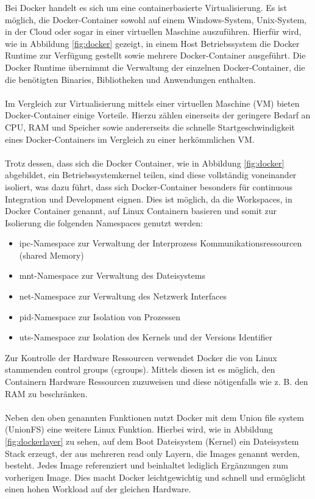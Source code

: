 Bei Docker handelt es sich um eine containerbasierte Virtualisierung. Es ist möglich, die Docker-Container sowohl auf einem Windows-System, Unix-System, in der Cloud oder sogar in einer virtuellen Maschine auszuführen. Hierfür wird, wie in Abbildung \ref{fig:docker} gezeigt, in einem Host Betriebssystem die Docker Runtime zur Verfügung gestellt sowie mehrere Docker-Container ausgeführt. Die Docker Runtime übernimmt die Verwaltung der einzelnen Docker-Container, die die benötigten Binaries, Bibliotheken und Anwendungen enthalten. 
\\\\
Im Vergleich zur Virtualisierung mittels einer virtuellen Maschine (VM) bieten Docker-Container einige Vorteile. Hierzu zählen einerseits der geringere Bedarf an CPU, RAM und Speicher sowie andererseits die schnelle Startgeschwindigkeit eines Docker-Containers im Vergleich zu einer herkömmlichen VM.
\\\\
Trotz dessen, dass sich die Docker Container, wie in Abbildung \ref{fig:docker} abgebildet, ein Betriebssystemkernel teilen, sind diese vollständig voneinander isoliert, was dazu führt, dass sich Docker-Container besonders für continuous Integration und Development eignen. Dies ist möglich, da die Workspaces, in Docker Container genannt, auf Linux Containern basieren und somit zur Isolierung die folgenden Namespaces genutzt werden:
\begin{itemize}
	\item ipc-Namespace zur Verwaltung der Interprozess Kommunikationsressourcen (shared Memory)
	\item mnt-Namespace zur Verwaltung des Dateisystems
	\item net-Namespace zur Verwaltung des Netzwerk Interfaces
	\item pid-Namespace zur Isolation von Prozessen
	\item uts-Namespace zur Isolation des Kernels und der Versions Identifier
\end{itemize}
Zur Kontrolle der Hardware Ressourcen verwendet Docker die von Linux stammenden control groups (cgroups). Mittels diesen ist es möglich, den Containern Hardware Ressourcen zuzuweisen und diese nötigenfalls wie z. B. den RAM zu beschränken.
\\\\
Neben den oben genannten Funktionen nutzt Docker mit dem Union file system (UnionFS) eine weitere Linux Funktion. Hierbei wird, wie in Abbildung \ref{fig:dockerlayer} zu sehen, auf dem Boot Dateisystem (Kernel) ein Dateisystem Stack erzeugt, der aus mehreren read only Layern, die Images genannt werden, besteht. Jedes Image referenziert und beinhaltet lediglich Ergänzungen zum vorherigen Image. Dies macht Docker leichtgewichtig und schnell und ermöglicht einen hohen Workload auf der gleichen Hardware.
